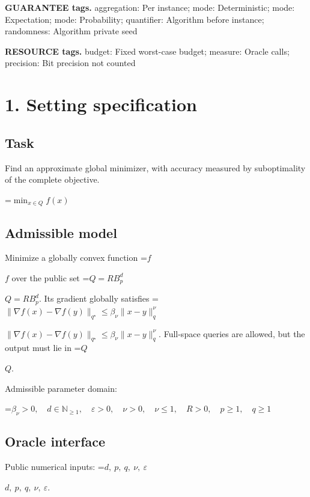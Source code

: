 \documentclass[10pt,a4paper]{article}
\newcommand{\AtlasMath}[1]{\par\begingroup\centering\setbox0=\hbox{$\displaystyle #1$}\ifdim\wd0>1.4\linewidth\typeout{ATLAS WIDE FORMULA: \the\wd0}\fi\ifdim\wd0>\linewidth\resizebox{\linewidth}{!}{\box0}\else\box0\fi\par\endgroup}
\newcommand{\AtlasInlineMath}[1]{\begingroup\setbox0=\hbox{$#1$}\ifdim\wd0>.4\linewidth\endgroup\AtlasMath{#1}\else\endgroup$#1$\fi}
\begin{document}
\textbf{GUARANTEE tags.} aggregation: Per instance; mode: Deterministic; mode: Expectation; mode: Probability; quantifier: Algorithm before instance; randomness: Algorithm private seed



\textbf{RESOURCE tags.} budget: Fixed worst-case budget; measure: Oracle calls; precision: Bit precision not counted



\section{1. Setting specification}


\subsection{Task}


Find an approximate global minimizer, with accuracy measured by suboptimality of the complete objective.




\AtlasMath{\min_{x\in Q}f(x)}




\subsection{Admissible model}


Minimize a globally convex function \AtlasInlineMath{f} over the public set \AtlasInlineMath{Q=RB_p^d}. Its gradient globally satisfies \AtlasInlineMath{\|\nabla f(x)-\nabla f(y)\|_{q^\star}\le\beta_\nu\|x-y\|_q^\nu}. Full-space queries are allowed, but the output must lie in \AtlasInlineMath{Q}.



Admissible parameter domain:


\AtlasMath{\beta_\nu>0,\quad d\in\mathbb{N}_{\ge1},\quad \varepsilon>0,\quad \nu>0,\quad \nu\le1,\quad R>0,\quad p\ge1,\quad q\ge1}




\subsection{Oracle interface}


Public numerical inputs: \AtlasInlineMath{d,\ p,\ q,\ \nu,\ \varepsilon}.
\end{document}
